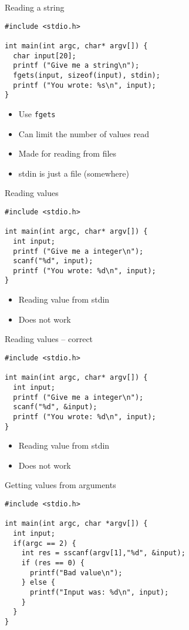 \documentclass{beamer}
\begin{document}
\begin{frame}[fragile]{Reading a string}
\begin{lstlisting}[frame=single]
#include <stdio.h>

int main(int argc, char* argv[]) {
  char input[20];
  printf ("Give me a string\n");
  fgets(input, sizeof(input), stdin);
  printf ("You wrote: %s\n", input);
}
\end{lstlisting}
\begin{itemize}
\item Use \lstinline{fgets}
\item Can limit the number of values read
\item Made for reading from files
\item stdin is just a file (somewhere)
\end{itemize}
\end{frame}




\begin{frame}[fragile]{Reading values}
\begin{lstlisting}[frame=single]
#include <stdio.h>

int main(int argc, char* argv[]) {
  int input;
  printf ("Give me a integer\n");
  scanf("%d", input);
  printf ("You wrote: %d\n", input);
}
\end{lstlisting}
\begin{itemize}
\item Reading value from stdin
\pause
\item Does not work
\end{itemize}
\end{frame}



\begin{frame}[fragile]{Reading values -- correct}
\begin{lstlisting}[frame=single]
#include <stdio.h>

int main(int argc, char* argv[]) {
  int input;
  printf ("Give me a integer\n");
  scanf("%d", &input);
  printf ("You wrote: %d\n", input);
}
\end{lstlisting}
\begin{itemize}
\item Reading value from stdin
\pause
\item Does not work
\end{itemize}
\end{frame}



\begin{frame}[fragile]{Getting values from arguments}
\begin{lstlisting}[frame=single]
#include <stdio.h>

int main(int argc, char *argv[]) {
  int input;
  if(argc == 2) {
    int res = sscanf(argv[1],"%d", &input);
    if (res == 0) {
      printf("Bad value\n");
    } else {
      printf("Input was: %d\n", input);
    }
  }
}

\end{lstlisting}

\end{frame}
\end{document}

